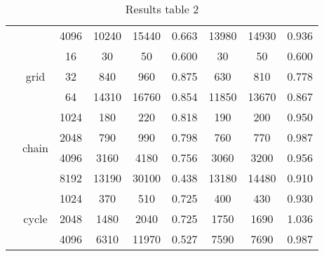 \begin{table}
{\begin{tabular}{c|c|c|c|c|c|c|c|c}
   &  &  4096 &  10240 & 15440 &  0.663  & 13980 & 14930 &  0.936 \\
   \cline{2-9}
   &  \multirow{3}{*}{grid} &  16 &  30 & 50 &  0.600  & 30 & 50 &  0.600 \\
   &  &  32 &  840 & 960 &  0.875  & 630 & 810 &  0.778 \\
   &  &  64 &  14310 & 16760 &  0.854  & 11850 & 13670 &  0.867 \\
   \cline{2-9}
   &  \multirow{4}{*}{chain} &  1024 &  180 & 220 &  0.818  & 190 & 200 &  0.950 \\
   &  &  2048 &  790 & 990 &  0.798  & 760 & 770 &  0.987 \\
   &  &  4096 &  3160 & 4180 &  0.756  & 3060 & 3200 &  0.956 \\
   &  &  8192 &  13190 & 30100 &  0.438  & 13180 & 14480 &  0.910 \\
   \cline{2-9}
   &  \multirow{3}{*}{cycle} &  1024 &  370 & 510 &  0.725  & 400 & 430 &  0.930 \\
   &  &  2048 &  1480 & 2040 &  0.725  & 1750 & 1690 &  1.036 \\
   &  &  4096 &  6310 & 11970 &  0.527  & 7590 & 7690 &  0.987 \\
   \cline{2-9}
   \hline
\end{tabular}
}
\caption{Results table 2}
\end{table}

